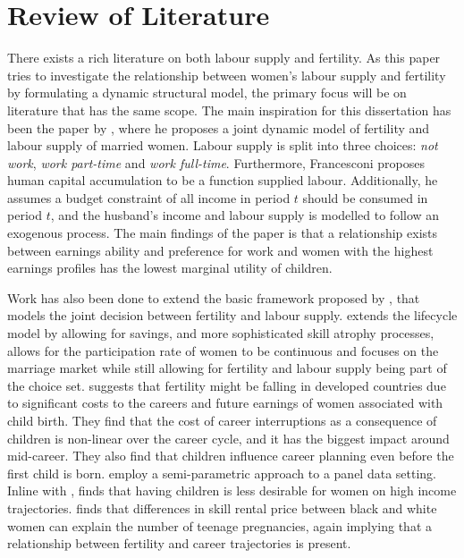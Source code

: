 \section{Review of Literature}\label{sec:lit_review}

There exists a rich literature on both labour supply and fertility. As this paper tries to investigate the relationship between women's labour supply and fertility by formulating a dynamic  structural model, the primary focus will be on literature that has the same scope. The main inspiration for this dissertation has been the paper by \textcite{francesconi_joint_2002}, where he proposes a joint dynamic model of fertility and labour supply of married women. Labour supply is split into three choices: \textit{not work}, \textit{work part-time} and \textit{work full-time}. Furthermore, Francesconi proposes human capital accumulation to be a function supplied labour. Additionally, he assumes a budget constraint of all income in period $t$ should be consumed in period $t$, and the husband's income and labour supply is modelled to follow an exogenous process. The main findings of the paper is that a relationship exists between earnings ability and preference for work and women with the highest earnings profiles has the lowest marginal utility of children.

Work has also been done to extend the basic framework proposed by \textcite{francesconi_joint_2002}, that models the joint decision between fertility and labour supply.  \textcite{adda_career_2011} extends the lifecycle model by allowing for savings, and more sophisticated skill atrophy processes, \textcite{gayle_life-cyle_2006} allows for the participation rate of women to be continuous and \textcite{keane_role_2010} focuses on the marriage market while still allowing for fertility and labour supply being part of the choice set. \textcite{adda_career_2011} suggests that fertility might be falling in developed countries due to significant costs to the careers and future earnings of women associated with child birth. They find that the cost of career interruptions as a consequence of children is non-linear over the career cycle, and it has the biggest impact around mid-career. They also find that children influence career planning even before the first child is born. \textcite{gayle_life-cyle_2006} employ a semi-parametric approach to a panel data setting. Inline with \textcite{francesconi_joint_2002}, \textcite{gayle_life-cyle_2006} finds that having children is less desirable for women on high income trajectories. \textcite{keane_role_2010} finds that differences in skill rental price between black and white women can explain the number of teenage pregnancies, again implying that a relationship between fertility and career trajectories is present.


